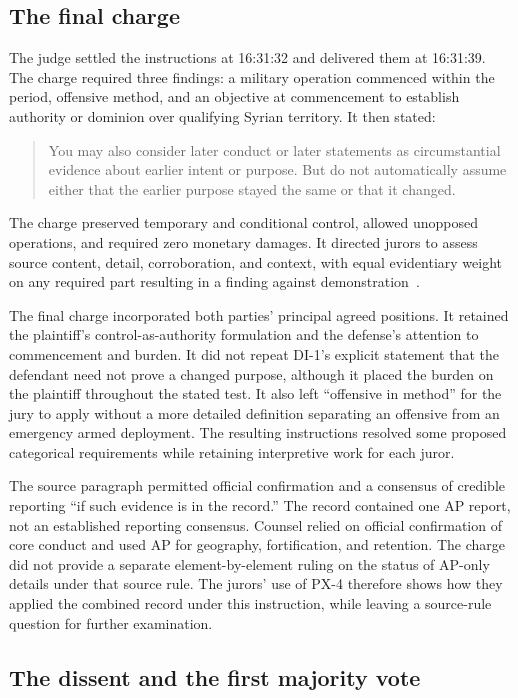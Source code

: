 \subsection{The final charge}

The judge settled the instructions at 16:31:32 and delivered them at 16:31:39.  The charge required three findings: a military operation commenced within the period, offensive method, and an objective at commencement to establish authority or dominion over qualifying Syrian territory.  It then stated:
\begin{quote}
You may also consider later conduct or later statements as circumstantial evidence about earlier intent or purpose.  But do not automatically assume either that the earlier purpose stayed the same or that it changed.
\end{quote}
The charge preserved temporary and conditional control, allowed unopposed operations, and required zero monetary damages.  It directed jurors to assess source content, detail, corroboration, and context, with equal evidentiary weight on any required part resulting in a finding against demonstration~\cite[events 336--338]{record}.

The final charge incorporated both parties' principal agreed positions.  It retained the plaintiff's control-as-authority formulation and the defense's attention to commencement and burden.  It did not repeat DI-1's explicit statement that the defendant need not prove a changed purpose, although it placed the burden on the plaintiff throughout the stated test.  It also left “offensive in method” for the jury to apply without a more detailed definition separating an offensive from an emergency armed deployment.  The resulting instructions resolved some proposed categorical requirements while retaining interpretive work for each juror.

The source paragraph permitted official confirmation and a consensus of credible reporting “if such evidence is in the record.”  The record contained one AP report, not an established reporting consensus.  Counsel relied on official confirmation of core conduct and used AP for geography, fortification, and retention.  The charge did not provide a separate element-by-element ruling on the status of AP-only details under that source rule.  The jurors' use of PX-4 therefore shows how they applied the combined record under this instruction, while leaving a source-rule question for further examination.

\subsection{The dissent and the first majority vote}

